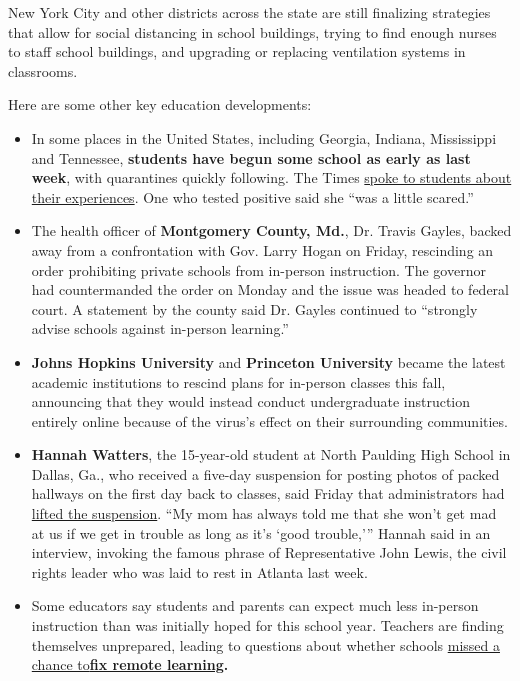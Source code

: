 New York City and other districts across the state are still finalizing
strategies that allow for social distancing in school buildings, trying
to find enough nurses to staff school buildings, and upgrading or
replacing ventilation systems in classrooms.

Here are some other key education developments:

\begin{itemize}
\item
  In some places in the United States, including Georgia, Indiana,
  Mississippi and Tennessee, \textbf{students have begun some school as
  early as last week}, with quarantines quickly following. The Times
  \href{https://www.nytimes3xbfgragh.onion/2020/08/06/us/coronavirus-students.html}{spoke
  to students about their experiences}. One who tested positive said she
  ``was a little scared.''
\item
  The health officer of \textbf{Montgomery County, Md.}, Dr. Travis
  Gayles, backed away from a confrontation with Gov. Larry Hogan on
  Friday, rescinding an order prohibiting private schools from in-person
  instruction. The governor had countermanded the order on Monday and
  the issue was headed to federal court. A statement by the county said
  Dr. Gayles continued to ``strongly advise schools against in-person
  learning.''
\item
  \textbf{Johns Hopkins University} and \textbf{Princeton University}
  became the latest academic institutions to rescind plans for in-person
  classes this fall, announcing that they would instead conduct
  undergraduate instruction entirely online because of the virus's
  effect on their surrounding communities. 
\item
  \textbf{Hannah Watters}, the 15-year-old student at North Paulding
  High School in Dallas, Ga., who received a five-day suspension for
  posting photos of packed hallways on the first day back to classes,
  said Friday that administrators had
  \href{https://www.nytimes3xbfgragh.onion/2020/08/06/us/north-paulding-high-school-coronavirus-georgia.html}{lifted
  the suspension}. ``My mom has always told me that she won't get mad at
  us if we get in trouble as long as it's `good trouble,''' Hannah said
  in an interview, invoking the famous phrase of Representative John
  Lewis, the civil rights leader who was laid to rest in Atlanta last
  week.
\item
  Some educators say students and parents can expect much less in-person
  instruction than was initially hoped for this school year. Teachers
  are finding themselves unprepared, leading to questions about whether
  schools
  \href{https://www.nytimes3xbfgragh.onion/2020/08/07/us/remote-learning-fall-2020.html}{missed
  a chance
  to}\textbf{\href{https://www.nytimes3xbfgragh.onion/2020/08/07/us/remote-learning-fall-2020.html}{fix
  remote learning}.}
\end{itemize}

